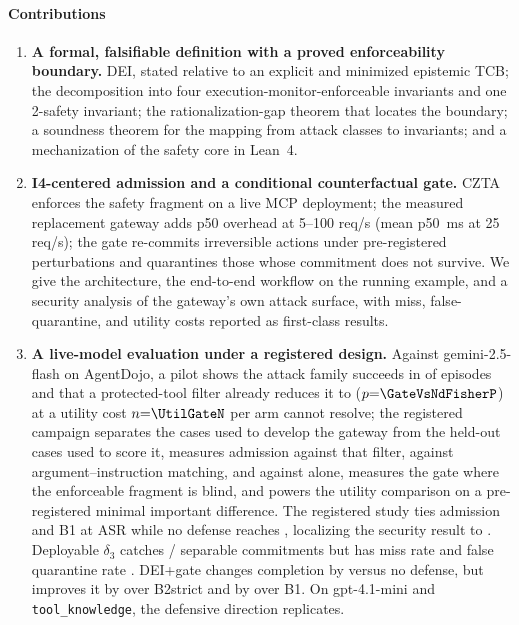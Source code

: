\paragraph*{Contributions}
\begin{enumerate}[leftmargin=1.3em,itemsep=1pt,label=\textbf{C\arabic*}]
\item \textbf{A formal, falsifiable definition with a proved
enforceability boundary.} DEI, stated relative to an explicit and
minimized epistemic TCB; the decomposition into four
execution-monitor-enforceable invariants and one 2-safety invariant; the
rationalization-gap theorem that locates the boundary; a soundness
theorem for the mapping from attack classes to invariants; and a
mechanization of the safety core in Lean~4.
\item \textbf{I4-centered admission and a conditional counterfactual gate.}
CZTA enforces the safety fragment on a live MCP deployment; the
measured replacement gateway adds \RqFiveOverheadRange{} p50 overhead
at 5--100 req/s (mean p50 \RqFiveATwoTwentyFiveMedian\,ms at 25 req/s); the gate
re-commits irreversible actions under pre-registered perturbations and
quarantines those whose commitment does not survive. We give the
architecture, the end-to-end workflow on the running example, and a
security analysis of the gateway's own attack surface, with miss,
false-quarantine, and utility costs reported as first-class results.
\item \textbf{A live-model evaluation under a registered design.}
Against gemini-2.5-flash on AgentDojo, a pilot shows the attack family
succeeds in \SecNdASR{} of episodes and that a protected-tool filter
already reduces it to \SecGateASR{} ($p{=}\GateVsNdFisherP$) at a utility
cost $n{=}\UtilGateN$ per arm cannot resolve; the registered campaign
separates the cases used to develop the gateway from the held-out cases
used to score it, measures admission against that filter, against
argument--instruction matching, and against \Ifour{} alone, measures the
gate where the enforceable fragment is blind, and powers the utility
comparison on a pre-registered minimal important difference.
The registered study ties admission and B1 at ASR
\SpSecDeiASR{} while no defense reaches \SpSecNoDefenseASR, localizing
the security result to \Ifour. Deployable $\delta_3$ catches
\RqTwoSeparableDeltaThreeK/\RqTwoSeparableDeltaThreeN{} separable
commitments but has miss rate \RqTwoDeltaThreeMissRate{} and false
quarantine rate \RqTwoHonestDeltaThreeRate. DEI+gate changes completion
by \RqThreeUtilDeiGatePairedRD{} versus no defense, but improves it by
\RqThreeUtilDeiGateVsBTwoStrictPairedRD{} over B2strict and by
\RqThreeUtilDeiGateVsBOnePairedRD{} over B1. On gpt-4.1-mini and
\texttt{tool\_knowledge}, the defensive direction replicates.
\end{enumerate}


